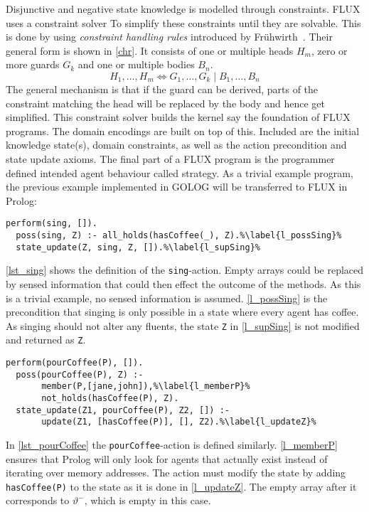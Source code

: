 Disjunctive and negative state knowledge is modelled through constraints. FLUX uses a constraint solver To simplify these constraints until they are solvable. This is done by using \emph{constraint handling rules} introduced by Frühwirth~\cite{fruhwirth_theory_1998}. Their general form is shown in \autoref{chr}. It consists of one or multiple heads $H_m$, zero or more guards $G_k$ and one or multiple bodies $B_n$.
\begin{equation}\label{chr}
  H_1,\ldots,H_m\Leftrightarrow G_1,\ldots,G_k \mid B_1,\ldots,B_n
\end{equation}
The general mechanism is that if the guard can be derived, parts of the constraint matching the head will be replaced by the body and hence get simplified. This constraint solver builds the kernel say the foundation of FLUX programs. The domain encodings are built on top of this. Included are the initial knowledge state(s), domain constraints, as well as the action precondition and state update axioms. The final part of a FLUX program is the programmer defined intended agent behaviour called strategy. As a trivial example program, the previous example implemented in GOLOG will be transferred to FLUX in Prolog:
\begin{lstlisting}[caption={Defintion of the \texttt{sing}-action.}, label=lst_sing]
  perform(sing, []).
  poss(sing, Z) :- all_holds(hasCoffee(_), Z).%\label{l_possSing}%
  state_update(Z, sing, Z, []).%\label{l_supSing}%
\end{lstlisting}
\autoref{lst_sing} shows the definition of the \texttt{sing}-action. Empty arrays could be replaced by sensed information that could then effect the outcome of the methods. As this is a trivial example, no sensed information is assumed. \autoref{l_possSing} is the precondition that singing is only possible in a state where every agent has coffee. As singing should not alter any fluents, the state \texttt{Z} in \autoref{l_supSing} is not modified and returned as \texttt{Z}.
\begin{lstlisting}[firstnumber=4, caption={Definition of the \texttt{pourCoffee}-action}, label=lst_pourCoffee]
  perform(pourCoffee(P), []).
  poss(pourCoffee(P), Z) :-
       member(P,[jane,john]),%\label{l_memberP}%
       not_holds(hasCoffee(P), Z).
  state_update(Z1, pourCoffee(P), Z2, []) :-
       update(Z1, [hasCoffee(P)], [], Z2).%\label{l_updateZ}%
\end{lstlisting}
In \autoref{lst_pourCoffee} the \texttt{pourCoffee}-action is defined similarly. \autoref{l_memberP} ensures that Prolog will only look for agents that actually exist instead of iterating over memory addresses. The action must modify the state by adding \texttt{hasCoffee(P)} to the state as it is done in \autoref{l_updateZ}. The empty array after it corresponds to $\vartheta^-$, which is empty in this case.
